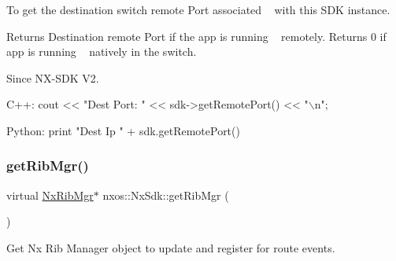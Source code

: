 To get the destination switch remote Port associated ~\newline
with this S\+DK instance. ~\newline
 \begin{DoxyReturn}{Returns}
Destination remote Port if the app is running ~\newline
 remotely. Returns 0 if app is running ~\newline
 natively in the switch. ~\newline
 
\end{DoxyReturn}
\begin{DoxySince}{Since}
N\+X-\/\+S\+DK V2. ~\newline
 
\begin{DoxyCode}
C++:                                                                                              
     cout << \textcolor{stringliteral}{"Dest Port: "} << sdk->getRemotePort() << \textcolor{stringliteral}{"\(\backslash\)n"};                                             
                                                                                                  
Python:                                                                                           
   print \textcolor{stringliteral}{"Dest Ip "} + sdk.getRemotePort()                                                             
\end{DoxyCode}
 
\end{DoxySince}
\mbox{\label{classnxos_1_1_nx_sdk_a3cdb42126b1132cf9aa00426a8d5d428}} 
\subsubsection{\texorpdfstring{get\+Rib\+Mgr()}{getRibMgr()}}
{\footnotesize\ttfamily virtual \mbox{\hyperlink{classnxos_1_1_nx_rib_mgr}{Nx\+Rib\+Mgr}}$\ast$ nxos\+::\+Nx\+Sdk\+::get\+Rib\+Mgr (\begin{DoxyParamCaption}{ }\end{DoxyParamCaption})\hspace{0.3cm}{\ttfamily [pure virtual]}}

Get Nx Rib Manager object to update and register for route events.

